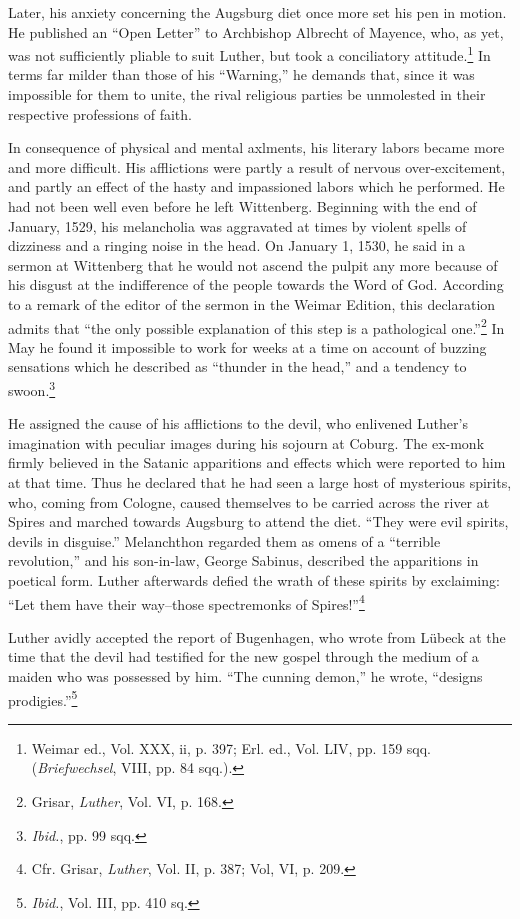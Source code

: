 Later, his anxiety concerning the Augsburg diet once more set his
pen in motion. He published an “Open Letter” to Archbishop Albrecht of
Mayence, who, as yet, was not sufficiently pliable to suit
Luther, but took a conciliatory attitude.\footnote
{Weimar ed., Vol. XXX, ii, p. 397; Erl. ed., Vol. LIV, pp. 159 sqq. (\textit{Briefwechsel},
VIII, pp. 84 sqq.).}
In terms far milder than
those of his “Warning,” he demands that, since it was impossible for
them to unite, the rival religious parties be unmolested in their respective
professions of faith.

In consequence of physical and mental axlments, his literary labors
became more and more difficult. His afflictions were partly a result of
nervous over-excitement, and partly an effect of the hasty and impassioned
labors which he performed. He had not been well even
before he left Wittenberg. Beginning with the end of January, 1529,
his melancholia was aggravated at times by violent spells of dizziness
and a ringing noise in the head. On January 1, 1530, he said in a sermon
at Wittenberg that he would not ascend the pulpit any more
because of his disgust at the indifference of the people towards the
Word of God. According to a remark of the editor of the sermon in
the Weimar Edition, this declaration admits that “the only possible
explanation of this step is a pathological one.”\footnote
{Grisar, \textit{Luther}, Vol. VI, p. 168.}
In May he found it
impossible to work for weeks at a time on account of buzzing sensations
which he described as “thunder in the head,” and a tendency to
swoon.\footnote{\textit{Ibid.}, pp. 99 sqq.}

He assigned the cause of his afflictions to the devil, who enlivened
Luther’s imagination with peculiar images during his sojourn at Coburg.
The ex-monk firmly believed in the Satanic apparitions and
effects which were reported to him at that time. Thus he declared
that he had seen a large host of mysterious spirits, who, coming from
Cologne, caused themselves to be carried across the river at Spires and
marched towards Augsburg to attend the diet. “They were evil spirits,
devils in disguise.” Melanchthon regarded them as omens of a “terrible
revolution,” and his son-in-law, George Sabinus, described the
apparitions in poetical form. Luther afterwards defied the wrath of
these spirits by exclaiming: “Let them have their way--those spectremonks
of Spires!”\footnote{Cfr. Grisar, \textit{Luther}, Vol. II, p. 387; Vol, VI, p. 209.}

Luther avidly accepted the report of Bugenhagen, who wrote from Lübeck
at the time that the devil had testified for the new gospel through the medium of a maiden who was
possessed by him. “The cunning demon,” he wrote, “designs prodigies.”\footnote
{\textit{Ibid.}, Vol. III, pp. 410 sq.}

